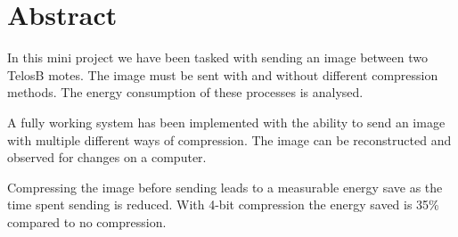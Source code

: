 \section{Abstract}
In this mini project we have been tasked with sending an image between two TelosB motes. The image must be sent with and without different compression methods. The energy consumption of these processes is analysed.

A fully working system has been implemented with the ability to send an image with multiple different ways of compression. The image can be reconstructed and observed for changes on a computer.

Compressing the image before sending leads to a measurable energy save as the time spent sending is reduced. With 4-bit compression the energy saved is 35\% compared to no compression.